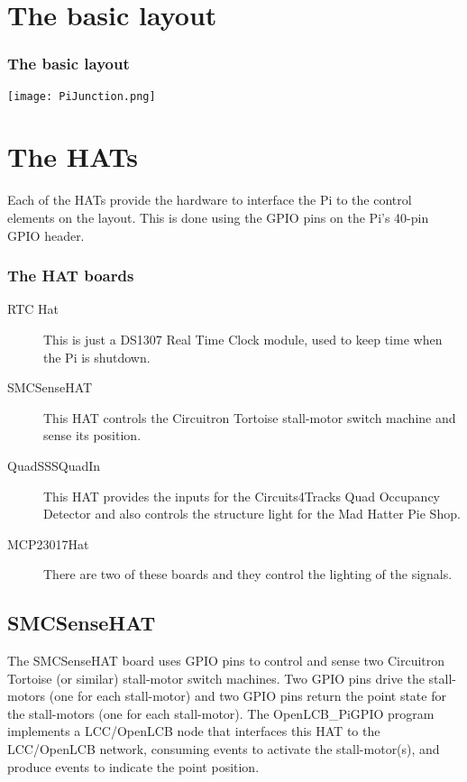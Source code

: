 \documentclass[letterpaper]{article} \usepackage{beamerarticle}
\begin{document}
\section{The basic layout}

\begin{frame}
   \frametitle{The basic layout}
   \texttt{[image: PiJunction.png]}
\end{frame}

\section{The HATs}

Each of the HATs provide the hardware to interface the Pi to the control
elements on the layout. This is done using the GPIO pins on the Pi's 40-pin
GPIO header.  

\begin{frame}
   \frametitle{The HAT boards}
   \begin{description}
   \item[RTC Hat] This is just a DS1307 Real Time Clock module, used to keep 
   time when the Pi is shutdown.
   \item[SMCSenseHAT] This HAT controls the Circuitron Tortoise stall-motor 
   switch machine and sense its position.
   \item[QuadSSSQuadIn] This HAT provides the inputs for the Circuits4Tracks 
   Quad Occupancy Detector and also controls the structure light for the Mad 
   Hatter Pie Shop.
   \item[MCP23017Hat] There are two of these boards and they control the 
   lighting of the signals.
   \end{description}
\end{frame}

\subsection{SMCSenseHAT}

The SMCSenseHAT board uses GPIO pins to control and sense two Circuitron
Tortoise (or similar) stall-motor switch machines. Two GPIO pins drive the
stall-motors (one for each stall-motor) and two GPIO pins return the point
state for the stall-motors (one for each stall-motor). The OpenLCB\_PiGPIO
program implements a LCC/OpenLCB node that interfaces this HAT to the
LCC/OpenLCB network, consuming events to activate the stall-motor(s), and
produce events to indicate the point position.
\end{document}
